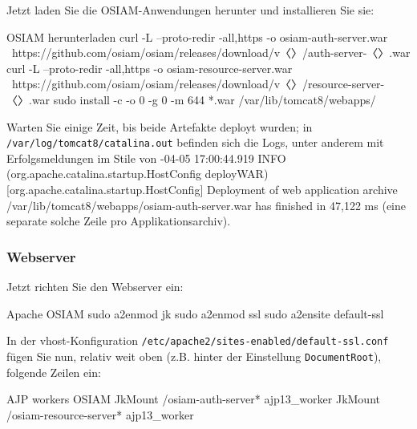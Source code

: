 \documentclass{tarentanleitung}
\newcommand{\vwiaversosiam}{2.5}
\begin{document}
\begin{minipage}{\linewidth}
Jetzt laden Sie die OSIAM-Anwendungen herunter und installieren Sie sie:

\begin{lstdump}{OSIAM herunterladen}
curl -L --proto-redir -all,https -o osiam-auth-server.war \
    https://github.com/osiam/osiam/releases/download/v〈\lstdumpesc{\vwiaversosiam}〉/auth-server-〈\lstdumpesc{\vwiaversosiam}〉.war
curl -L --proto-redir -all,https -o osiam-resource-server.war \
    https://github.com/osiam/osiam/releases/download/v〈\lstdumpesc{\vwiaversosiam}〉/resource-server-〈\lstdumpesc{\vwiaversosiam}〉.war
sudo install -c -o 0 -g 0 -m 644 *.war /var/lib/tomcat8/webapps/
\end{lstdump}
\end{minipage}

Warten Sie einige Zeit, bis beide Artefakte deployt wurden; in
\texttt{/var/log/tomcat8/catalina.out} befinden sich die Logs,
unter anderem mit Erfolgsmeldungen im Stile von {\ttfamily
2018-04-05 17:00:44.919    INFO
(org.apache.catalina.startup.HostConfig deployWAR)%
[org.apache.catalina.startup.HostConfig] Deployment of web application archive
/var/lib/tomcat8/webapps/osiam-auth-server.war has finished in 47,122 ms}
(eine separate solche Zeile pro Applikationsarchiv).

\subsubsection{Webserver}\label{subsubsec:setup-osiam-apache}

\begin{minipage}{\linewidth}
Jetzt richten Sie den Webserver ein:

\begin{lstdump}{Apache OSIAM}
sudo a2enmod jk
sudo a2enmod ssl
sudo a2ensite default-ssl
\end{lstdump}
\end{minipage}

\begin{minipage}{\linewidth}
In der vhost-Konfiguration \texttt{/etc/apache2/sites-enabled/default-ssl.conf}
fügen Sie nun, relativ weit oben (z.B. hinter der Einstellung
\texttt{DocumentRoot}), folgende Zeilen ein:

\begin{lstdump}{AJP workers OSIAM}
JkMount /osiam-auth-server* ajp13_worker
JkMount /osiam-resource-server* ajp13_worker
\end{lstdump}
\end{minipage}
\end{document}
